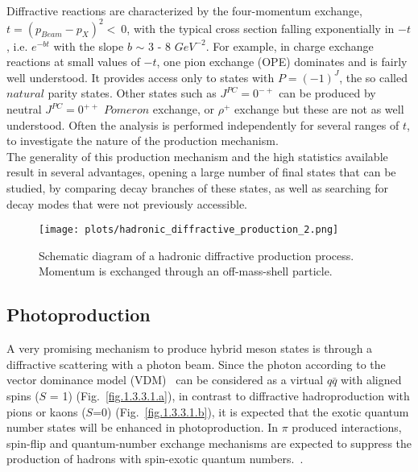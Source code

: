  ~\par Diffractive reactions are characterized by the four-momentum exchange, $t = (p_{Beam}-p_{X})^{2}<~0$, with the typical cross section falling exponentially in $-t$, i.e. $e^{-bt}$ with the slope $b$ $\sim$ 3 - 8 $GeV^{-2}$. For example, in charge exchange reactions at small values of $-t$, one pion exchange (OPE) dominates and is fairly well understood. It provides access only to states with $P = (-1)^{J}$, the so called $natural$ parity states. Other states such as $J^{PC} = 0^{-+}$ can be produced by neutral $J^{PC} = 0^{++}$ $Pomeron$ exchange, or $\rho^{+}$ exchange but these are not as well understood. Often the analysis is performed independently for several ranges of $t$, to investigate the nature of the production mechanism.\\
The generality of this production mechanism and the high statistics available result in several advantages, opening a large number of final states that can be studied, by comparing decay branches of these states, as well as searching for decay modes that were not previously accessible.

\begin{figure}[H]
    \centering
        \texttt{[image: plots/hadronic\_diffractive\_production\_2.png]}
        \caption{Schematic diagram of a hadronic diffractive production process. Momentum is exchanged through an off-mass-shell particle.}
        \label{fig.1.3.2}
\end{figure}

 \subsection{Photoproduction}

 A very promising mechanism to produce hybrid meson states is through a diffractive scattering with a photon beam. Since the photon according to the vector dominance model (VDM)~\cite{Bauer78} can be considered as a virtual $q\bar{q}$ with aligned spins ($S$ = 1) (Fig.~\ref{fig.1.3.3.1.a}), in contrast to diffractive hadroproduction with pions or kaons ($S$=0) (Fig.~\ref{fig.1.3.3.1.b}), it is expected that the exotic quantum number states will be enhanced in photoproduction. In $\pi$ produced interactions, spin-flip and quantum-number exchange mechanisms are expected to suppress the production of hadrons with spin-exotic quantum numbers.~\cite{Isgur85, Szczepaniak01}.

